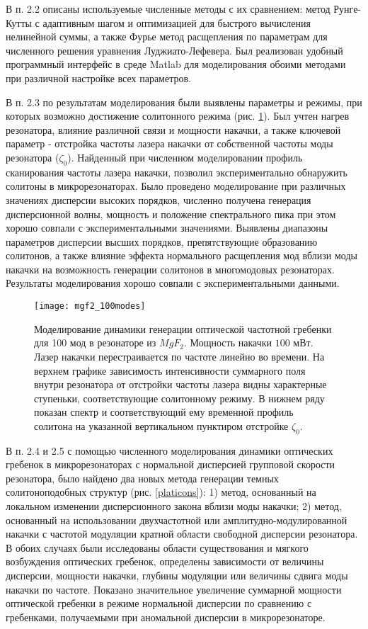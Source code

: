 В п. 2.2 описаны используемые численные методы с их сравнением: метод Рунге-Кутты с адаптивным шагом и оптимизацией для быстрого вычисления нелинейной суммы, а также Фурье метод расщепления по параметрам для численного решения уравнения Луджиато-Лефевера. Был реализован удобный программный интерфейс в среде Matlab для моделирования обоими методами при различной настройке всех параметров.

В п. 2.3 по результатам моделирования были выявлены параметры и режимы, при которых возможно достижение солитонного режима (рис. \ref{100modes}). Был учтен нагрев резонатора, влияние различной связи и мощности накачки, а также ключевой параметр - отстройка частоты лазера накачки от собственной частоты моды резонатора ($\zeta_0$). Найденный при численном моделировании профиль сканирования частоты лазера накачки, позволил экспериментально обнаружить солитоны в микрорезонаторах. Было проведено моделирование при различных значениях дисперсии высоких порядков, численно получена генерация дисперсионной волны, мощность и положение спектрального пика при этом хорошо совпали с экспериментальными значениями. Выявлены диапазоны параметров дисперсии высших порядков, препятствующие образованию солитонов, а также влияние эффекта нормального расщепления мод вблизи моды накачки на возможность генерации солитонов в многомодовых резонаторах. Результаты моделирования хорошо совпали с экспериментальными данными.

\begin{figure}[!htb]
  \centering
  \texttt{[image: mgf2\_100modes]}
  \caption{Моделирование динамики генерации оптической частотной гребенки для 100 мод в резонаторе из $MgF_2$. Мощность накачки $100$ мВт. Лазер накачки перестраивается по частоте линейно во времени. На верхнем графике зависимость интенсивности суммарного поля внутри резонатора от отстройки частоты лазера видны характерные ступеньки, соответствующие солитонному режиму. В нижнем ряду показан спектр и соответствующий ему временной профиль солитона на указанной вертикальном пунктиром отстройке $\zeta_0$.}
  \label{100modes}
\end{figure}

В п. 2.4 и 2.5 с помощью численного моделирования динамики оптических гребенок в микрорезонаторах с нормальной дисперсией групповой скорости резонатора, было найдено два новых метода генерации темных солитоноподобных структур (рис. \ref{platicons}): 1) метод, основанный на локальном изменении дисперсионного закона вблизи моды накачки; 2) метод, основанный на использовании двухчастотной или амплитудно-модулированной накачки с частотой модуляции кратной области свободной дисперсии резонатора. В обоих случаях были исследованы области существования и мягкого возбуждения оптических гребенок, определены зависимости от величины дисперсии, мощности накачки, глубины модуляции или величины сдвига моды накачки по частоте. Показано значительное увеличение суммарной мощности оптической гребенки в режиме нормальной дисперсии по сравнению с гребенками, получаемыми при аномальной дисперсии в микрорезонаторе.


